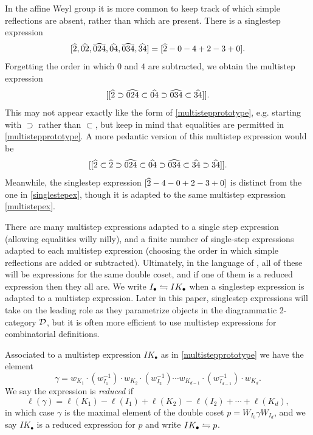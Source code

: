 \begin{example} In the affine Weyl group it is more common to keep track of which simple reflections are absent, rather than which are present. There is a singlestep expression
\begin{equation} \label{singlestepex} [\widehat{2}, \widehat{02}, \widehat{024}, \widehat{04}, \widehat{034}, \widehat{34}] = [\widehat{2} - 0 - 4 + 2 - 3 + 0]. \end{equation}
Forgetting the order in which $0$ and $4$ are subtracted, we obtain the multistep expression
\begin{equation} \label{multistepex} [[\widehat{2} \supset \widehat{024} \subset \widehat{04} \supset \widehat{034} \subset \widehat{34}]]. \end{equation}
This may not appear exactly like the form of \eqref{multistepprototype}, e.g. starting with $\supset$ rather than $\subset$, but keep in mind that equalities are permitted in \eqref{multistepprototype}. A more pedantic version of this multistep expression would be
\[ [[\widehat{2} \subset \widehat{2} \supset \widehat{024} \subset \widehat{04} \supset \widehat{034} \subset \widehat{34} \supset \widehat{34}]]. \]
Meanwhile, the singlestep expression $[\widehat{2} - 4 - 0 + 2 - 3 + 0]$ is distinct from the one in \eqref{singlestepex}, though it is adapted to the same multistep expression \eqref{multistepex}.
\end{example}

\begin{remark} \label{rmk:adapted} There are many multistep expressions adapted to a single step expression (allowing equalities willy nilly), and a finite number of single-step expressions adapted to each multistep expression (choosing the order in which simple reflections are added or subtracted). Ultimately, in the language of \cite{EKo}, all of these will be expressions for the same double coset, and if one of them is a reduced expression then they all are. We write $I_{\bullet} \leftrightharpoons IK_{\bullet}$ when a singlestep expression is adapted to a multistep expression. Later in this paper, singlestep expressions will take on the leading role as they parametrize objects in the diagrammatic 2-category $\mathcal{D}$, but it is often more efficient to use multistep expressions for combinatorial definitions. \end{remark}

\begin{defn} \label{def:reducedexpression} Associated to a multistep expression $IK_{\bullet}$ as in \eqref{multistepprototype} we have the element
\begin{equation} \gamma = w_{K_1} \cdot (w_{I_1}^{-1}) \cdot w_{K_2} \cdot (w_{I_2}^{-1}) \cdots w_{K_{d-1}} \cdot (w_{I_{d-1}}^{-1}) \cdot w_{K_d}. \end{equation}
We say the expression is \emph{reduced} if
\begin{equation} \label{lengthviagamma} \ell(\gamma) = \ell(K_1) - \ell(I_1) + \ell(K_2) - \ell(I_2) + \cdots + \ell(K_d), \end{equation}
in which case $\gamma$ is the maximal element of the double coset $p = W_{I_0} \gamma W_{I_d}$, and we say $IK_{\bullet}$ is a reduced expression for $p$ and write $IK_{\bullet} \leftrightharpoons p$.
\end{defn}

